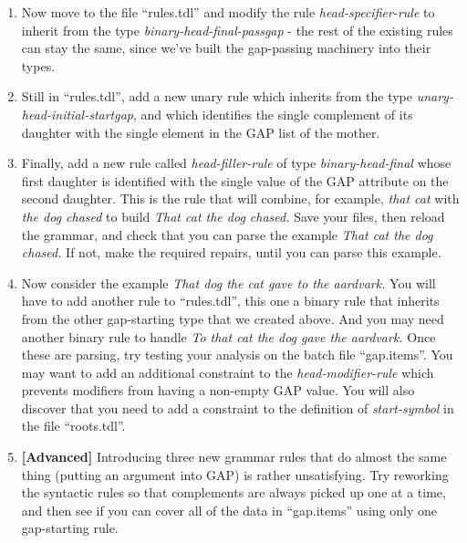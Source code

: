 \documentclass[10pt]{article}
\begin{document}
\begin{enumerate}
\item Now move to the file ``rules.tdl'' and modify the rule {\it
head-specifier-rule} to inherit from the type {\it binary-head-final-passgap}
- the rest of the existing rules can stay the same, since we've built the
gap-passing machinery into their types.  

\item Still in ``rules.tdl'', add a new unary rule which inherits from the
type {\it unary-head-initial-startgap}, and which identifies the single
complement of its daughter with the single element in the GAP list of the 
mother.

\item Finally, add a new rule called {\it head-filler-rule} of type {\it
binary-head-final} whose first daughter is identified with the single value of
the GAP attribute on the second daughter.  This is the rule that will combine,
for example, {\it that cat} with {\it the dog chased} to build {\it That cat
the dog chased.} Save your files, then reload the grammar, and check that you
can parse the example {\it That cat the dog chased.}  If not, make the
required repairs, until you can parse this example.

\item Now consider the example {\it That dog the cat gave to the aardvark.}
You will have to add another rule to ``rules.tdl'', this one a binary rule
that inherits from the other gap-starting type that we created above.  And
you may need another binary rule to handle {\it To that cat the dog gave
the aardvark.}  Once these are parsing, try testing your analysis on the
batch file ``gap.items''.  You may want to add an additional constraint
to the {\it head-modifier-rule} which prevents modifiers from having a
non-empty GAP value.  You will also discover that you need to add a
constraint to the definition of {\it start-symbol} in the file ``roots.tdl''.

\item {\bf [Advanced]} Introducing three new grammar rules that do almost the
same thing (putting an argument into GAP) is rather unsatisfying.  Try
reworking the syntactic rules so that complements are always picked up one at
a time, and then see if you can cover all of the data in ``gap.items'' using
only one gap-starting rule.

\end{enumerate}
\end{document}
